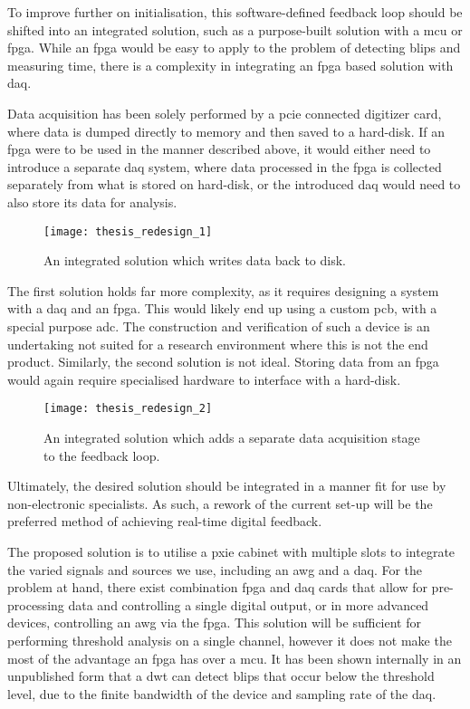 To improve further on initialisation, this software-defined feedback loop should be shifted into an integrated solution, such as a purpose-built solution with a \gls{mcu} or \gls{fpga}. While an \gls{fpga} would be easy to apply to the problem of detecting blips and measuring time, there is a complexity in integrating an \gls{fpga} based solution with \gls{daq}. 

Data acquisition has been solely performed by a \gls{pcie} connected digitizer card, where data is dumped directly to memory and then saved to a hard-disk. If an \gls{fpga} were to be used in the manner described above, it would either need to introduce a separate \gls{daq} system, where data processed in the \gls{fpga} is collected separately from what is stored on hard-disk, or the introduced \gls{daq} would need to also store its data for analysis.

\begin{figure}[htbp]
	\centering
	\texttt{[image: thesis\_redesign\_1]}
	\caption{An integrated solution which writes data back to disk.}
	\label{fig::redesign_1}
\end{figure}

The first solution holds far more complexity, as it requires designing a system with a \gls{daq} and an \gls{fpga}. This would likely end up using a custom \gls{pcb}, with a special purpose \gls{adc}. The construction and verification of such a device is an undertaking not suited for a research environment where this is not the end product. Similarly, the second solution is not ideal. Storing data from an \gls{fpga} would again require specialised hardware to interface with a hard-disk. 


\begin{figure}[htbp]
	\centering
	\texttt{[image: thesis\_redesign\_2]}
	\caption{An integrated solution which adds a separate data acquisition stage to the feedback loop.}
	\label{fig::redesign_2}
\end{figure}

Ultimately, the desired solution should be integrated in a manner fit for use by non-electronic specialists. As such, a rework of the current set-up will be the preferred method of achieving real-time digital feedback.

The proposed solution is to utilise a \gls{pxie} cabinet with multiple slots to integrate the varied signals and sources we use, including an \gls{awg} and a \gls{daq}. For the problem at hand, there exist combination \gls{fpga} and \gls{daq} cards that allow for pre-processing data and controlling a single digital output, or in more advanced devices, controlling an \gls{awg} via the \gls{fpga}. This solution will be sufficient for performing threshold analysis on a single channel, however it does not make the most of the advantage an \gls{fpga} has over a \gls{mcu}. It has been shown internally in an unpublished form that a \gls{dwt} can detect blips that occur below the threshold level, due to the finite bandwidth of the device and sampling rate of the \gls{daq}.

